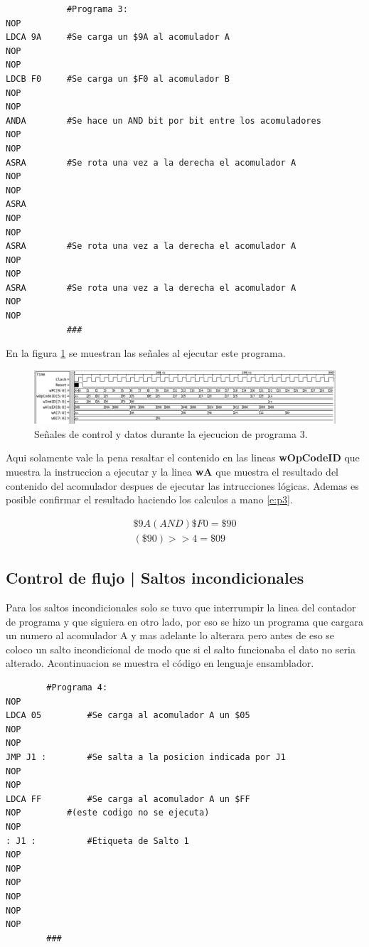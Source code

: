 \documentclass[paper=letter, fontsize=12pt]{article}
\begin{document}
\begin{lstlisting}
			#Programa 3:
NOP
LDCA 9A		#Se carga un $9A al acomulador A
NOP
NOP
LDCB F0		#Se carga un $F0 al acomulador B
NOP
NOP
ANDA		#Se hace un AND bit por bit entre los acomuladores
NOP
NOP
ASRA		#Se rota una vez a la derecha el acomulador A
NOP
NOP
ASRA
NOP
NOP
ASRA		#Se rota una vez a la derecha el acomulador A
NOP
NOP
ASRA		#Se rota una vez a la derecha el acomulador A
NOP
NOP
			###
\end{lstlisting}

En la figura \ref{i:p3} se muestran las señales al ejecutar este programa.\\

\begin{figure}[hbtp]
\centering
\includegraphics[width=1\linewidth]{../test/Prog3.png}
\caption{Señales de control y datos durante la ejecucion de programa 3.}
\label{i:p3}
\end{figure}

Aqui solamente vale la pena resaltar el contenido en las lineas \textbf{wOpCodeID} que muestra la instruccion a ejecutar y la linea \textbf{wA} que muestra el resultado del contenido del acomulador despues de ejecutar las intrucciones lógicas. Ademas es posible confirmar el resultado haciendo los calculos a mano \ref{e:p3}.

\begin{align} 
\label{e:p3}
\$9A  (AND) \$F0 = \$90 \\
(\$90) >> 4 = \$09
\end{align}


\subsection{Control de flujo | Saltos incondicionales}

Para los saltos incondicionales solo se tuvo que interrumpir la linea del contador de programa y que siguiera en otro lado, por eso se hizo un programa que cargara un numero al acomulador A y mas adelante lo alterara pero antes de eso se coloco un salto incondicional de modo que si el salto funcionaba el dato no seria alterado. Acontinuacion se muestra el código en lenguaje ensamblador.

\begin{lstlisting}
		#Programa 4:
NOP
LDCA 05			#Se carga al acomulador A un $05
NOP
NOP
JMP J1 :		#Se salta a la posicion indicada por J1
NOP
NOP
LDCA FF			#Se carga al acomulador A un $FF
NOP			#(este codigo no se ejecuta)
NOP
: J1 :			#Etiqueta de Salto 1
NOP
NOP
NOP
NOP
NOP
NOP
		###
\end{lstlisting}
\end{document}
